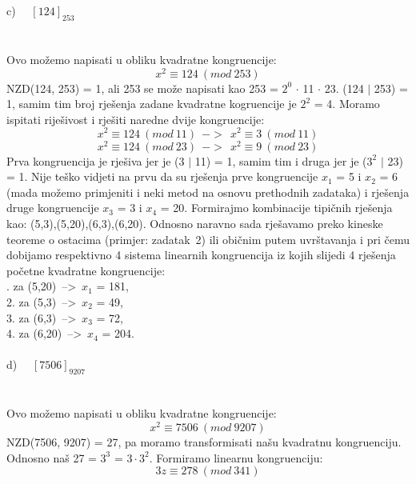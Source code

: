 \documentclass[12pt]{article}
\begin{document}
\begin{enumerate}
c) ~~$[124]_{253}$ \\ \\ \\ 
		Ovo možemo napisati u obliku kvadratne kongruencije: 
		\begin{equation*}
		x^2 \equiv 124~(mod~253)
		\end{equation*}
		NZD(124, 253) = 1, ali 253 se može napisati kao 253 = $2^0$ ${\cdot}$ 11 ${\cdot}$ 23.
		(124 ${\mid}$ 253) = 1, samim tim broj rješenja zadane kvadratne kogruencije je $2^2$ = 4.
 		Moramo ispitati riješivost i rješiti naredne dvije kongruencije:
        \begin{equation*}
		x^2 \equiv 124~(mod~11)~~->~~ x^2 \equiv 3~(mod~11)
		\end{equation*}
		\begin{equation*}
		x^2 \equiv 124~(mod~23)~~->~~ x^2 \equiv 9~(mod~23)
		\end{equation*}
		Prva kongruencija je rješiva jer je (3 ${\mid}$ 11) = 1, samim tim i druga jer je ($3^2$ ${\mid}$ 23) = 1.
		Nije teško vidjeti na prvu da su rješenja prve kongruencije $x_1$ = 5 i $x_2$ = 6 (mada možemo primjeniti i neki metod na osnovu prethodnih zadataka) i rješenja druge kongruencije $x_3$ = 3 i $x_4$ = 20.  
		Formirajmo kombinacije tipičnih rješenja kao: (5,3),(5,20),(6,3),(6,20).
		Odnosno naravno sada rješavamo preko kineske teoreme o ostacima (primjer: zadatak~2) ili 
		običnim putem uvrštavanja i pri čemu dobijamo
		respektivno 4 sistema linearnih kongruencija iz kojih slijedi 4 rješenja početne kvadratne kongruencije: \\
		. za (5,20)~-->~$x_1$ = 181, \\
		2. za (5,3)~-->~$x_2$ = 49, \\
		3. za (6,3)~-->~$x_3$ = 72, \\
		4. za (6,20)~-->~$x_4$ = 204. \\
		\\
d) ~~$[7506]_{9207}$ \\ \\ \\ 
		Ovo možemo napisati u obliku kvadratne kongruencije: 
		\begin{equation*}
		x^2 \equiv 7506~(mod~9207)
		\end{equation*}
		NZD(7506, 9207) = 27, pa moramo transformisati našu kvadratnu kongruenciju. Odnosno 
		naš 27 = $3^3$ = $3{\cdot}3^2$. Formiramo linearnu kongruenciju:
		\begin{equation*}
		3z \equiv 278~(mod~341)
		\end{equation*}

\end{enumerate}
\end{document}

